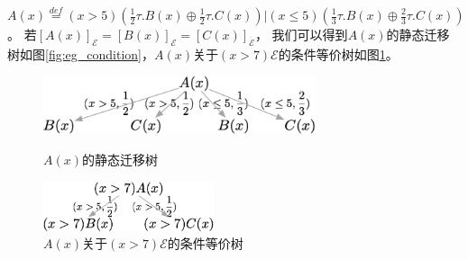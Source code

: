 \begin{example}\label{eg:conditional}
   $A(x)\stackrel{def}{=}(x>5)(\frac{1}{2}\tau.B(x)\oplus\frac{1}{2}\tau.C(x))|(x\leq 5)(\frac{1}{3}\tau.B(x)\oplus\frac{2}{3}\tau.C(x))$。
   若$[A(x)]_{\mathcal{E}}=[B(x)]_{\mathcal{E}}=[C(x)]_{\mathcal{E}}$，
   我们可以得到$A(x)$的静态迁移树如图\ref{fig:eg_condition}，$A(x)$关于$(x>7)\mathcal{E}$的条件等价树如图\ref{fig:eg_condition2}。

\begin{figure}[!htp]
   \begin{minipage}{0.6\textwidth}
   \centering
   \includegraphics[width=8cm]{../figures/example_condition.png}
   \caption{$A(x)$的静态迁移树}
  \label{fig:eg_condition}
\end{minipage}\hfill
\begin{minipage}{0.45\textwidth}
   \centering
   \includegraphics[width=5cm]{../figures/example_condition2.png}
   \caption{$A(x)$关于$(x>7)\mathcal{E}$的条件等价树}
   \label{fig:eg_condition2}
\end{minipage}
 \end{figure}
\end{example}
